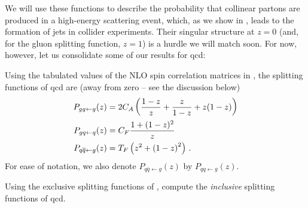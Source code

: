 

We will use these functions to describe the probability that collinear partons are produced in a high-energy scattering event, which, as we show in , leads to the formation of jets in collider experiments.
%
Their singular structure at \(z = 0\) (and, for the gluon splitting function, \(z = 1\)) is a hurdle we will match soon.
%
For now, however, let us consolidate some of our results for \gls{qcd}:

\begin{example}
    \label{ex:qcd-splitting-functions}

    Using the tabulated values of the NLO spin correlation matrices in , the splitting functions of \gls{qcd} are (away from zero -- see the discussion below)
    \begin{align}
        P_{gg \leftarrow g}(z)
        &=
        2C_A \left(\frac{1-z}{z} + \frac{z}{1-z} + z(1-z)\right)
        \\
        P_{gq \leftarrow q}(z)
        &=
        C_F \frac{1 + (1-z)^2}{z}
        \\
        P_{q\overline{q} \leftarrow g}(z)
        &=
        T_F \left(z^2 + \left(1-z\right)^2\right)
        \,.
    \end{align}
    For ease of notation, we also denote \(P_{q \overline{q} \leftarrow g}(z)\) by \(P_{qq\leftarrow g}(z)\).
\end{example}


\begin{exercise}
    \label{ex:qcd-inclusive-splitting}
    Using the exclusive splitting functions of , compute the \emph{inclusive} splitting functions of \gls{qcd}.
\end{exercise}



